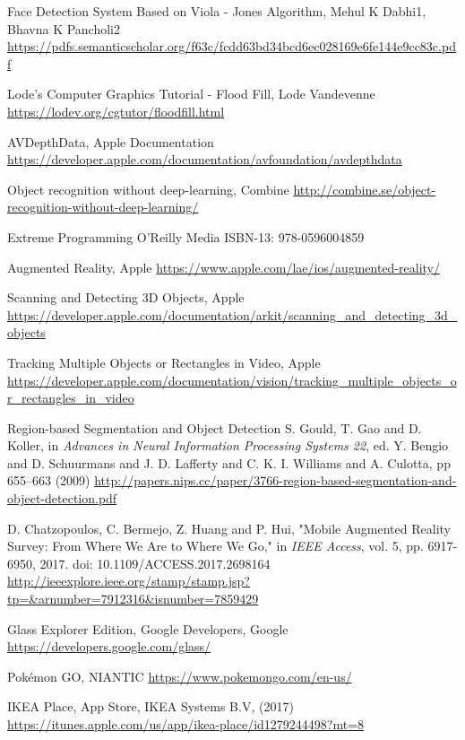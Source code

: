 \begin{thebibliography}{X}
Face Detection System Based on Viola - Jones Algorithm, Mehul K Dabhi1, Bhavna K Pancholi2
\url{https://pdfs.semanticscholar.org/f63c/fcdd63bd34bcd6ec028169e6fe144e9cc83c.pdf}

Lode's Computer Graphics Tutorial - Flood Fill, Lode Vandevenne
\url{https://lodev.org/cgtutor/floodfill.html}

AVDepthData, Apple Documentation
\url{https://developer.apple.com/documentation/avfoundation/avdepthdata}

Object recognition without deep-learning, Combine
\url{http://combine.se/object-recognition-without-deep-learning/}

Extreme Programming
O'Reilly Media
ISBN-13: 978-0596004859

Augmented Reality, Apple
\url{https://www.apple.com/lae/ios/augmented-reality/}

Scanning and Detecting 3D Objects, Apple
\url{https://developer.apple.com/documentation/arkit/scanning_and_detecting_3d_objects}

Tracking Multiple Objects or Rectangles in Video, Apple
\url{https://developer.apple.com/documentation/vision/tracking_multiple_objects_or_rectangles_in_video}

Region-based Segmentation and Object Detection
S. Gould, T. Gao and D. Koller, in \textit{Advances in Neural Information Processing Systems 22}, 
ed. Y. Bengio and D. Schuurmans and J. D. Lafferty 
and C. K. I. Williams and A. Culotta, 
pp 655--663
(2009)
\url{http://papers.nips.cc/paper/3766-region-based-segmentation-and-object-detection.pdf}

D. Chatzopoulos, C. Bermejo, Z. Huang and P. Hui, "Mobile Augmented Reality Survey: From Where We Are to Where We Go," in \textit{IEEE Access}, vol. 5, pp. 6917-6950, 2017.
doi: 10.1109/ACCESS.2017.2698164
\url{http://ieeexplore.ieee.org/stamp/stamp.jsp?tp=&arnumber=7912316&isnumber=7859429}

Glass Explorer Edition, Google Developers, Google
\url{https://developers.google.com/glass/}

Pokémon GO, NIANTIC
\url{https://www.pokemongo.com/en-us/}


IKEA Place, App Store, IKEA Systems B.V, (2017)
\url{https://itunes.apple.com/us/app/ikea-place/id1279244498?mt=8}


\end{thebibliography}
